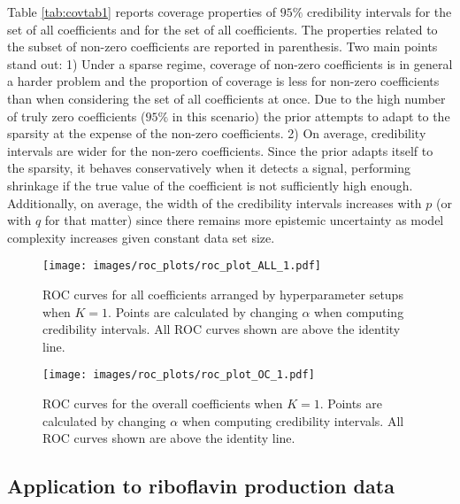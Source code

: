 Table \ref{tab:covtab1} reports coverage properties of $95\%$ credibility intervals for the set of all coefficients and for the set of all coefficients. The properties related to the subset of non-zero coefficients are reported in parenthesis. Two main points stand out: 1) Under a sparse regime, coverage of non-zero coefficients is in general a harder problem and the proportion of coverage is less for non-zero coefficients than when considering the set of all coefficients at once. Due to the high number of truly zero coefficients ($95\%$ in this scenario) the prior attempts to adapt to the sparsity at the expense of the non-zero coefficients.  2) On average, credibility intervals are wider for the non-zero coefficients. Since the prior adapts itself to the sparsity, it behaves conservatively when it detects a signal, performing shrinkage if the true value of the coefficient is not sufficiently high enough. Additionally, on average, the width of the credibility intervals increases with $p$ (or with $q$ for that matter) since there remains more epistemic uncertainty as model complexity increases given constant data set size.
 \begin{figure}[t!]%
	\centering
	\texttt{[image: images/roc\_plots/roc\_plot\_ALL\_1.pdf]}
	\caption{ROC curves for all coefficients arranged by hyperparameter setups when $K=1$. Points are calculated by changing $\alpha$ when computing credibility intervals. All ROC curves shown are above the identity line. }
	\label{fig:roc_ALL_1}
\end{figure}

 \begin{figure}[t!]%
	\centering
	\texttt{[image: images/roc\_plots/roc\_plot\_OC\_1.pdf]}
	\caption{ROC curves for the overall coefficients when $K=1$. Points are calculated by changing $\alpha$ when computing credibility intervals. All ROC curves shown are above the identity line.}
	\label{fig:roc_OC_1}
\end{figure}

\subsection{Application to riboflavin production data}

